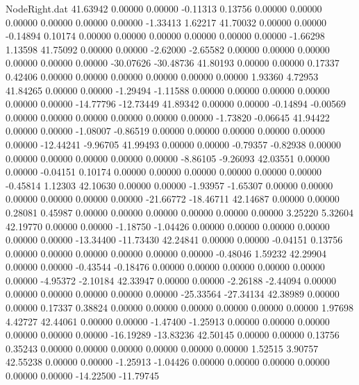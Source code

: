 \begin{filecontents}{NodeRight.dat}
  41.63942    0.00000    0.00000    -0.11313    0.13756    0.00000    0.00000    0.00000    0.00000    0.00000    0.00000   -1.33413    1.62217
  41.70032    0.00000    0.00000    -0.14894    0.10174    0.00000    0.00000    0.00000    0.00000    0.00000    0.00000   -1.66298    1.13598
  41.75092    0.00000    0.00000    -2.62000   -2.65582    0.00000    0.00000    0.00000    0.00000    0.00000    0.00000  -30.07626  -30.48736
  41.80193    0.00000    0.00000     0.17337    0.42406    0.00000    0.00000    0.00000    0.00000    0.00000    0.00000    1.93360    4.72953
  41.84265    0.00000    0.00000    -1.29494   -1.11588    0.00000    0.00000    0.00000    0.00000    0.00000    0.00000  -14.77796  -12.73449
  41.89342    0.00000    0.00000    -0.14894   -0.00569    0.00000    0.00000    0.00000    0.00000    0.00000    0.00000   -1.73820   -0.06645
  41.94422    0.00000    0.00000    -1.08007   -0.86519    0.00000    0.00000    0.00000    0.00000    0.00000    0.00000  -12.44241   -9.96705
  41.99493    0.00000    0.00000    -0.79357   -0.82938    0.00000    0.00000    0.00000    0.00000    0.00000    0.00000   -8.86105   -9.26093
  42.03551    0.00000    0.00000    -0.04151    0.10174    0.00000    0.00000    0.00000    0.00000    0.00000    0.00000   -0.45814    1.12303
  42.10630    0.00000    0.00000    -1.93957   -1.65307    0.00000    0.00000    0.00000    0.00000    0.00000    0.00000  -21.66772  -18.46711
  42.14687    0.00000    0.00000     0.28081    0.45987    0.00000    0.00000    0.00000    0.00000    0.00000    0.00000    3.25220    5.32604
  42.19770    0.00000    0.00000    -1.18750   -1.04426    0.00000    0.00000    0.00000    0.00000    0.00000    0.00000  -13.34400  -11.73430
  42.24841    0.00000    0.00000    -0.04151    0.13756    0.00000    0.00000    0.00000    0.00000    0.00000    0.00000   -0.48046    1.59232
  42.29904    0.00000    0.00000    -0.43544   -0.18476    0.00000    0.00000    0.00000    0.00000    0.00000    0.00000   -4.95372   -2.10184
  42.33947    0.00000    0.00000    -2.26188   -2.44094    0.00000    0.00000    0.00000    0.00000    0.00000    0.00000  -25.33564  -27.34134
  42.38989    0.00000    0.00000     0.17337    0.38824    0.00000    0.00000    0.00000    0.00000    0.00000    0.00000    1.97698    4.42727
  42.44061    0.00000    0.00000    -1.47400   -1.25913    0.00000    0.00000    0.00000    0.00000    0.00000    0.00000  -16.19289  -13.83236
  42.50145    0.00000    0.00000     0.13756    0.35243    0.00000    0.00000    0.00000    0.00000    0.00000    0.00000    1.52515    3.90757
  42.55238    0.00000    0.00000    -1.25913   -1.04426    0.00000    0.00000    0.00000    0.00000    0.00000    0.00000  -14.22500  -11.79745

\end{filecontents}
